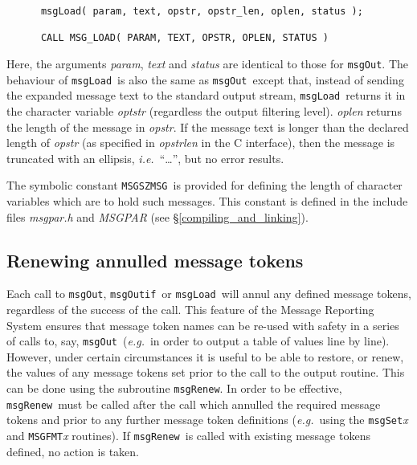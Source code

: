\documentclass[twoside,11pt]{article}
\newcommand{\htmlref}[2]{#1}
\newcommand{\latex}[1]{#1}
\newcommand{\xlabel}[1]{}
\renewcommand{\_}{\texttt{\symbol{95}}}
\newcommand{\func}[1]{\texttt{#1}}
\newcommand{\farg}[1]{\textit{#1}}
\newcommand{\const}[1]{\texttt{#1}}
\newcommand{\fname}[1]{\textit{#1}}
\newcommand{\msgszmsg}{\const{MSG\_\_SZMSG}}
\newcommand{\msgload}{\func{msgLoad}}
\newcommand{\msgout}{\func{msgOut}}
\newcommand{\msgoutif}{\func{msgOutif}}
\newcommand{\msgrenew}{\func{msgRenew}}
\begin{document}
\begin {small}
\begin{verbatim}
      msgLoad( param, text, opstr, opstr_len, oplen, status );

      CALL MSG_LOAD( PARAM, TEXT, OPSTR, OPLEN, STATUS )
\end{verbatim}
\end {small}

Here, the arguments \farg{param}, \farg{text} and \farg{status} are identical to those for \msgout.
The behaviour of \msgload\ is also the same as \msgout\ except that, instead of
sending the expanded message text to the standard output stream, \msgload\
returns it in the character variable \farg{optstr} (regardless the output filtering
level).
\farg{oplen} returns the length of the message in \farg{opstr}.
If the message text is longer than the declared length of \farg{opstr} (as
specified in \farg{opstr\_len} in the C interface), then the
message is truncated with an ellipsis, \textit{i.e.}\ ``\ldots'', but no error
results.

The symbolic constant \msgszmsg\ is provided for defining the length of
character variables which are to hold such messages.
This constant is defined in the include files
\htmlref
{\fname{msg\_par.h} and \fname{MSG\_PAR}}{compiling_and_linking}\latex{ (see \S\ref{compiling_and_linking})}.


\subsection{\xlabel{renewing_annulled_message_tokens}Renewing annulled message tokens}

Each call to \msgout, \msgoutif\ or \msgload\ will annul any defined message
tokens, regardless of the success of the call.
This feature of the Message Reporting System ensures that message token names
can be re-used with safety in a series of calls to, say, \msgout\ (\textit{e.g.}\
in order to output a table of values line by line).
However, under certain circumstances it is useful to be able to restore, or
renew, the values of any message tokens set prior to the call to the output
routine. This can be done using the subroutine \msgrenew.
In order to be effective, \msgrenew\ must be called after the call
which annulled the required message tokens and prior to any further message
token  definitions (\textit{e.g.}\ using the \func{msgSet}\textit{x} and \func{MSG\_FMT}\textit{x}
routines).
If \msgrenew\ is called with existing message tokens defined, no action is
taken.
\end{document}
